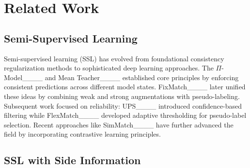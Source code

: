 \section{Related Work}
\label{sec:related}

\subsection{Semi-Supervised Learning}

Semi-supervised learning (SSL) has evolved from foundational consistency regularization methods to sophisticated deep learning approaches. The $\Pi$-Model____ and Mean Teacher____ established core principles by enforcing consistent predictions across different model states. FixMatch____ later unified these ideas by combining weak and strong augmentations with pseudo-labeling. Subsequent work focused on reliability: UPS____ introduced confidence-based filtering while FlexMatch____ developed adaptive thresholding for pseudo-label selection. Recent approaches like SimMatch____ have further advanced the field by incorporating contrastive learning principles.



\subsection{SSL with Side Information}

